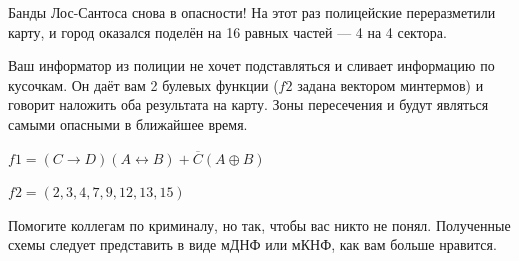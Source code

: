 \question
Банды Лос-Сантоса снова в опасности! На этот раз полицейские переразметили карту, и город оказался поделён на 16 равных частей — 4 на 4 сектора.

Ваш информатор из полиции не хочет подставляться и сливает информацию по кусочкам. Он даёт вам 2 булевых функции ($f2$ задана вектором минтермов)  и говорит наложить оба результата на карту. Зоны пересечения и будут являться самыми опасными в ближайшее время.

\begin{center}
$f1=(C\rightarrow D)(A \leftrightarrow B) + \overline{C}(A \oplus B)$

$f2=(2,3,4,7,9,12,13,15)$
\end{center}

Помогите коллегам по криминалу, но так, чтобы вас никто не понял. Полученные схемы следует представить в виде мДНФ или мКНФ, как вам больше нравится.